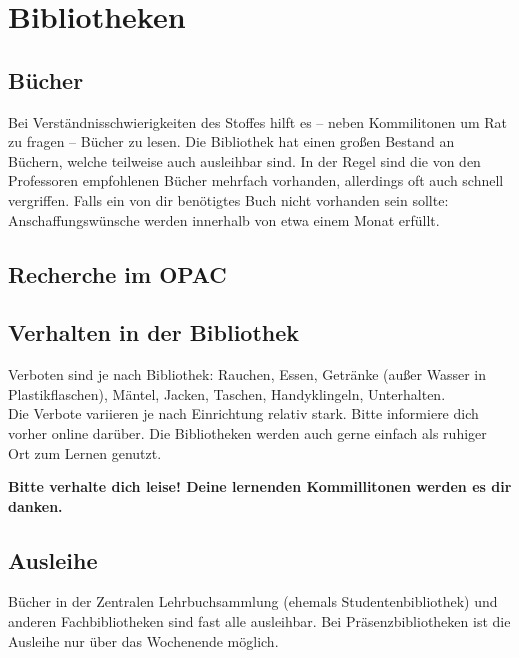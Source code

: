 ﻿\chapter{Bibliotheken}

\section{Bücher}

Bei Verständnisschwierigkeiten des Stoffes hilft es -- neben
Kommilitonen um Rat zu fragen -- Bücher zu lesen.  Die Bibliothek
hat einen großen Bestand an Büchern, welche teilweise auch ausleihbar
sind. In der Regel sind die von den Professoren empfohlenen Bücher
mehrfach vorhanden, allerdings oft auch schnell vergriffen. Falls ein
von dir benötigtes Buch nicht vorhanden sein sollte:
Anschaffungswünsche werden innerhalb von etwa einem Monat erfüllt.


\section{Recherche im OPAC}
	\begin{urlList}
	\end{urlList}

\section{Verhalten in der Bibliothek}
Verboten sind je nach Bibliothek: Rauchen, Essen, Getränke (außer Wasser in Plastikflaschen), Mäntel, Jacken, Taschen, Handyklingeln, Unterhalten.\\
Die Verbote variieren je nach Einrichtung relativ stark. Bitte informiere dich vorher online darüber.
Die Bibliotheken werden auch gerne einfach als ruhiger Ort zum Lernen genutzt.

\textbf{Bitte verhalte dich leise!
Deine lernenden Kommillitonen werden es dir danken.}

\section{Ausleihe}

Bücher in der Zentralen Lehrbuchsammlung (ehemals
Studentenbibliothek) und anderen Fachbibliotheken sind fast alle
ausleihbar. Bei Präsenzbibliotheken ist die Ausleihe nur über das
Wochenende möglich.

